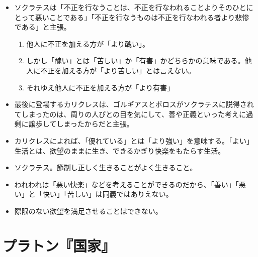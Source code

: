 \documentclass[uplatex]{bxjsarticle}
\begin{document}
\begin{itemize}
 \item ソクラテスは「不正を行なうことは、不正を行なわれることよりそのひとにとって悪いことである」「不正を行なうものは不正を行なわれる者より悲惨である」と主張。

   \begin{enumerate}
   \item 他人に不正を加える方が「より醜い」。
   \item しかし「醜い」とは「苦しい」か「有害」かどちらかの意味である。他人に不正を加える方が「より苦しい」とは言えない。
   \item それゆえ他人に不正を加える方が「より有害」
   \end{enumerate}

 \item 最後に登場するカリクレスは、ゴルギアスとポロスがソクラテスに説得されてしまったのは、周りの人びとの目を気にして、善や正義といった考えに過剰に譲歩してしまったからだと主張。

 \item カリクレスによれば、「優れている」とは「より強い」を意味する。「よい」生活とは、欲望のままに生き、できるかぎり快楽をもたらす生活。

\item ソクラテス。節制し正しく生きることがよく生きること。

\item われわれは「悪い快楽」などを考えることができるのだから、「善い」「悪い」と「快い」「苦しい」は同義ではありえない。

\item 際限のない欲望を満足させることはできない。


\end{itemize}



\section{プラトン『国家』}
\end{document}
